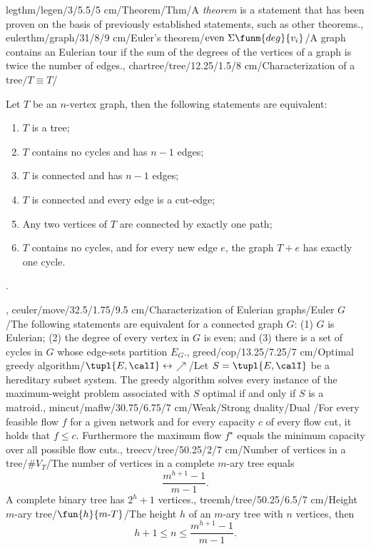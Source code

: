 legthm/legen/3/5.5/5 cm/Theorem/Thm/{A \emph{theorem} is a statement that has been proven on the basis of previously established statements, such as other theorems.},
eulerthm/graph/31/8/9 cm/{Euler's theorem}/$\mbox{even}\ \Sigma{\funm{deg}{v_i}}$/{A graph contains an Eulerian tour if the sum of the degrees of the vertices of a graph is twice the number of edges.},
chartree/tree/12.25/1.5/8 cm/{Characterization of a tree}/{$T\equiv T$}/{Let $T$ be an $n$-vertex graph, then the following statements are equivalent:\begin{enumerate}\item $T$ is a tree; \item $T$ contains no cycles and has $n-1$ edges; \item $T$ is connected and has $n-1$ edges; \item $T$ is connected and every edge is a cut-edge; \item Any two vertices of $T$ are connected by exactly one path; \item $T$ contains no cycles, and for every new edge $e$, the graph $T+e$ has exactly one cycle.\end{enumerate}.},
ceuler/move/32.5/1.75/9.5 cm/{Characterization of Eulerian graphs}/{Euler $G$}/{The following statements are equivalent for a connected graph $G$: (1) $G$ is Eulerian; (2) the degree of every vertex in $G$ is even; and (3) there is a set of cycles in $G$ whose edge-sets partition $E_G$.},
greed/cop/13.25/7.25/7 cm/{Optimal greedy algorithm}/{$\tupl{E,\calI}\leftrightarrow$\textdollaroldstyle$\nearrow$}/{Let $S=\tupl{E,\calI}$ be a hereditary subset system. The greedy algorithm solves every instance of the maximum-weight problem associated with $S$ optimal if and only if $S$ is a matroid.},
mincut/maflw/30.75/6.75/7 cm/{Weak/Strong duality}/{Dual \watertap}/{For every feasible flow $f$ for a given network and for every capacity $c$ of every flow cut, it holds that $f\leq c$. Furthermore the maximum flow $f^{\star}$ equals the minimum capacity over all possible flow cuts.},
treecv/tree/50.25/2/7 cm/{Number of vertices in a tree}/{$\#V_T$}/{The number of vertices in a complete $m$-ary tree equals\[\dfrac{m^{h+1}-1}{m-1}.\] A complete binary tree has $2^h+1$ vertices.},
treemh/tree/50.25/6.5/7 cm/{Height $m$-ary tree}/{$\fun{h}{m\mbox{-}T}$}/{The height $h$ of an $m$-ary tree with $n$ vertices, then \[h+1\leq n\leq\dfrac{m^{h+1}-1}{m-1}.\]}